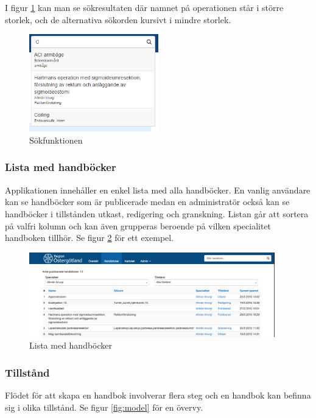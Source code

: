 I figur \ref{fig:search} kan man se sökresultaten där namnet på operationen står i större storlek, och de alternativa sökorden kursivt i mindre storlek.

\begin{figure}[H]
  \centering
  \includegraphics[width=0.5\textwidth]{images/site/search}
  \caption{Sökfunktionen}
  \label{fig:search}
\end{figure}


\subsubsection{Lista med handböcker}
Applikationen innehåller en enkel lista med alla handböcker. En vanlig användare kan se handböcker som är publicerade medan en administratör också kan se handböcker i tillstånden utkast, redigering och granskning. %
Listan går att sortera på valfri kolumn och kan även grupperas beroende på vilken specialitet handboken tillhör.
Se figur \ref{fig:list} för ett exempel.

\begin{figure}[H]
  \centering
  \includegraphics[width=0.95\textwidth]{images/site/list}
  \caption{Lista med handböcker}
  \label{fig:list}
\end{figure}

\subsubsection{Tillstånd}
Flödet för att skapa en handbok involverar flera steg och en handbok kan befinna sig i olika tillstånd.
Se figur \ref{fig:model} för en övervy.

